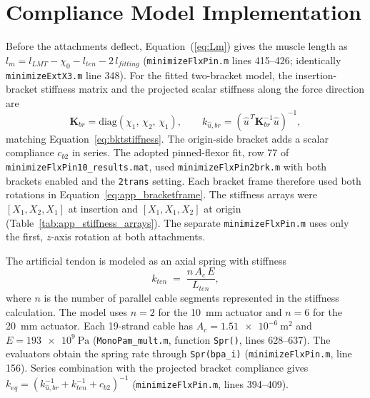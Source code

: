 \section{Compliance Model Implementation}

Before the attachments deflect, Equation~(\ref{eq:Lm}) gives the muscle length as $l_{m} = l_{LMT} - \chi_{0} - l_{ten} - 2\,l_{fitting}$ (\texttt{minimizeFlxPin.m} lines 415--426; identically \texttt{minimizeExtX3.m} line 348). For the fitted two-bracket model, the insertion-bracket stiffness matrix and the projected scalar stiffness along the force direction are
\begin{equation}
    \mathbf{K}_{br} = \mathrm{diag}(\chi_{1},\,\chi_{2},\,\chi_{1}),
    \qquad
    k_{\hat{u},br} = \left(\hat{u}^{\,T}\mathbf{K}_{br}^{-1}\hat{u}\right)^{-1},
    \label{eq:app_kbr}
\end{equation}
matching Equation~\ref{eq:bktstiffness}. The origin-side bracket adds a scalar compliance $c_{b2}$ in series. The adopted pinned-flexor fit, row 77 of \nolinkurl{minimizeFlxPin10_results.mat}, used \nolinkurl{minimizeFlxPin2brk.m} with both brackets enabled and the \texttt{2trans} setting. Each bracket frame therefore used both rotations in Equation~\eqref{eq:app_bracketframe}. The stiffness arrays were $[X_1,X_2,X_1]$ at insertion and $[X_1,X_1,X_2]$ at origin (Table~\ref{tab:app_stiffness_arrays}). The separate \nolinkurl{minimizeFlxPin.m} uses only the first, $z$-axis rotation at both attachments.

The artificial tendon is modeled as an axial spring with stiffness
\begin{equation}
    k_{ten} \;=\; \frac{n\,A_{c}\,E}{L_{ten}},
    \label{eq:app_tendon}
\end{equation}
where $n$ is the number of parallel cable segments represented in the stiffness calculation. The model uses $n=2$ for the \qty{10}{\mm} actuator and $n=6$ for the \qty{20}{\mm} actuator. Each 19-strand cable has $A_c=\qty{1.51e-6}{\metre\squared}$ and $E=\qty{193e9}{\pascal}$ (\nolinkurl{MonoPam_mult.m}, function \texttt{Spr()}, lines 628--637). The evaluators obtain the spring rate through \nolinkurl{Spr(bpa_i)} (\texttt{minimizeFlxPin.m}, line 156). Series combination with the projected bracket compliance gives $k_{eq} = \left(k_{\hat{u},br}^{-1} + k_{ten}^{-1} + c_{b2}\right)^{-1}$ (\texttt{minimizeFlxPin.m}, lines 394--409).

